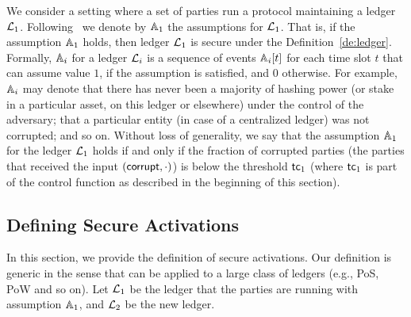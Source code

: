 We consider a setting where a set of parties run a protocol maintaining a ledger $\mathcal{L}_1$. Following~\cite{sidechain} we denote by $\mathbb{A}_1$
the assumptions for $\mathcal{L}_1$.
 That is, if the assumption $\mathbb{A}_1$ holds, then ledger $\mathcal{L}_1$ is secure under the Definition~\ref{de:ledger}.
Formally, $\mathbb{A}_i$ for a ledger $\mathcal{L}_i$ is a sequence of events $\mathbb{A}_i[t]$ for each time slot $t$ that can assume value $1$,
if the assumption is satisfied, and $0$ otherwise.
For example, $\mathbb{A}_i$ may denote that
there has never been a majority of hashing power (or stake in a particular
asset, on this ledger or elsewhere) under the control of the adversary; that a
particular entity (in case of a centralized ledger) was not corrupted; and so
on.
Without loss of generality, we say that the assumption $\mathbb{A}_1$ for the ledger $\mathcal{L}_1$ holds if and only if the fraction of corrupted parties (the parties
that received the input $(\mathsf{corrupt}, \cdot)$) is below the threshold $\mathsf{tc}_1$ (where $\mathsf{tc}_1$ is part of the control function as described in the beginning
of this section).







\subsection{Defining Secure Activations}
In this section, we provide the definition of secure activations. Our definition is generic in the sense that can be applied to a large class of ledgers
(e.g., PoS, PoW and so on).
Let $\mathcal{L}_1$ be the ledger that the parties are running with assumption $\mathbb{A}_1$, and 
$\mathcal{L}_2$ be the new ledger. 


